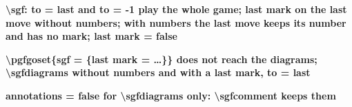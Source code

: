 \documentclass{article}
\newcommand\case[1]{\par\medskip\noindent\textbf{#1}\par\nopagebreak}
\begin{document}

\case{\textbackslash sgf: to = last and to = -1 play the whole game; last mark on the last move without numbers; with numbers the last move keeps its number and has no mark; last mark = false}
\begin{goban}\end{goban}
\begin{goban}\end{goban}
\begin{goban}\end{goban}
\begin{goban}\end{goban}

\case{\textbackslash pgfgoset\{sgf = \{last mark = \ldots\}\} does not reach the diagrams; \textbackslash sgfdiagrams without numbers and with a last mark, to = last}
{
}

\case{annotations = false for \textbackslash sgfdiagrams only: \textbackslash sgfcomment keeps them}
{
\par
{}
\par
{}
}
\end{document}
